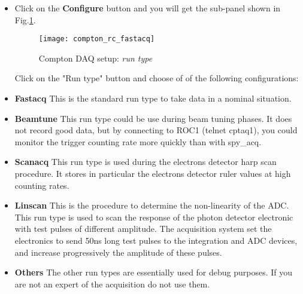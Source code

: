 {{\begin{itemize}
\item Click on the {\bf Configure} button and you will get the sub-panel shown in 
Fig.\ref{fig:compton_rc_fastacq}.
\begin{figure}[htp]
    \begin{center}
        \texttt{[image: compton\_rc\_fastacq]}
    \end{center}
    \caption[compton:runcontrol run type]{Compton DAQ setup: {\it run type} }
    \label{fig:compton_rc_fastacq}
\end{figure}
Click on the "Run type" button and choose of of the following configurations:

\item {\bf Fastacq}
This is the standard run type to take data in a nominal situation.
\item {\bf Beamtune} This run type could be use during beam tuning phases.
It does not record good data, but by connecting to ROC1 (telnet cptaq1),
you could monitor the trigger counting rate more quickly than with spy\_acq.

\item {\bf Scanacq} This run type is used during the electrons detector harp scan procedure.
It stores in particular the electrons detector ruler values at high counting
rates.
\item {\bf Linscan}
This is the procedure to determine the non-linearity of the ADC.
This run type is used to scan the response of the photon detector electronic
with test pulses of different amplitude. The acquisition system set the
electronics to send 50ns long test pulses to the integration and ADC devices,
and increase progressively the amplitude of these pulses.
\item {\bf Others}
The other run types are essentially used for debug purposes. If you are
not an expert of the acquisition do not use them.


\end{itemize}}}
